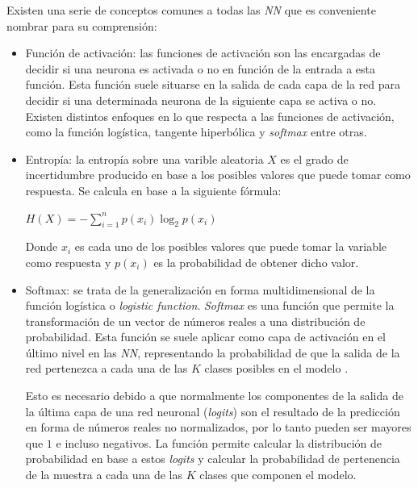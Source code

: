             Existen una serie de conceptos comunes a todas las \textit{NN} que es conveniente nombrar para su comprensión:


            \begin{itemize}

                \item Función de activación: las funciones de activación son las encargadas de decidir si una neurona es activada o no en función de la entrada a esta función. Esta función suele situarse en la salida de cada capa de la red para decidir si una determinada neurona de la siguiente capa se activa o no. Existen distintos enfoques en lo que respecta a las funciones de activación, como la función logística, tangente hiperbólica y \textit{softmax} entre otras.

                \item Entropía: la entropía sobre una varible aleatoria $X$ es el grado de incertidumbre producido en base a los posibles valores que puede tomar como respuesta. Se calcula en base a la siguiente fórmula:

                    \begin{center}
                        $H(X) = -\sum_{i = 1}^n p(x_i) \log_2 p(x_i)$
                    \end{center}

                    Donde $x_i$ es cada uno de los posibles valores que puede tomar la variable como respuesta y $p(x_i)$ es la probabilidad de obtener dicho valor. 


                \item Softmax: se trata de la generalización en forma multidimensional de la función logística o \textit{logistic function}. \textit{Softmax} es una función que permite la transformación de un vector de números reales a una distribución de probabilidad. Esta función se suele aplicar como capa de activación en el último nivel en las \textit{NN}, representando la probabilidad de que la salida de la red pertenezca a cada una de las $K$ clases posibles en el modelo \cite{Softmax}. 

                Esto es necesario debido a que normalmente los componentes de la salida de la última capa de una red neuronal (\textit{logits}) son el resultado de la predicción en forma de números reales no normalizados, por lo tanto pueden ser mayores que $1$ e incluso negativos. La función permite calcular la distribución de probabilidad en base a estos \textit{logits} y calcular la probabilidad de pertenencia de la muestra a cada una de las $K$ clases que componen el modelo.


\end{itemize}

